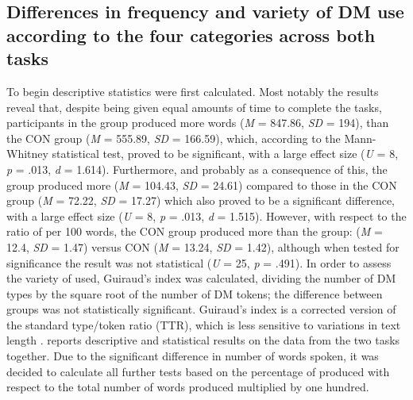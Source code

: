 \documentclass[output=paper]{langsci/langscibook}
\begin{document}
\subsection{Differences in frequency and variety of DM use according to the four categories across both tasks}


To begin descriptive statistics were first calculated. Most notably the results reveal that, despite being given equal amounts of time to complete the tasks, participants in the  group produced more words (\textit{M} = 847.86, \textit{SD} = 194), than the CON group (\textit{M} = 555.89, \textit{SD} = 166.59), which, according to the Mann-Whitney statistical test, proved to be significant, with a large effect size (\textit{U} = 8, \textit{p} = .013, \textit{d} = 1.614).  Furthermore, and probably as a consequence of this, the  group produced more  (\textit{M} = 104.43, \textit{SD} = 24.61) compared to those in the CON group (\textit{M} = 72.22, \textit{SD} = 17.27) which also proved to be a significant difference, with a large effect size (\textit{U} = 8, \textit{p} = .013, \textit{d} = 1.515). However, with respect to the ratio of  per 100 words, the CON group produced more than the  group:  (\textit{M} = 12.4, \textit{SD} = 1.47) versus CON (\textit{M} = 13.24, \textit{SD} = 1.42), although when tested for significance the result was not statistical (\textit{U} = 25, \textit{p} = .491). In order to assess the variety of  used, Guiraud’s index was calculated, dividing the number of DM types by the square root of the number of DM tokens; the difference between groups was not statistically significant. Guiraud’s index is a corrected version of the standard type/token ratio (TTR), which is less sensitive to variations in text length \citep{Daller2010}.  reports descriptive and statistical results on the data from the two tasks together.  Due to the significant difference in number of words spoken, it was decided to calculate all further tests based on the percentage of  produced with respect to the total number of words produced multiplied by one hundred.
\end{document}
